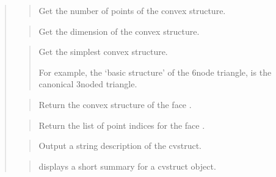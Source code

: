 \documentclass[a4paper,11pt,english]{sphinxmanual}
\begin{document}
\begin{quote}

\begin{quote}

Get the number of points of the convex structure.
\end{quote}

\begin{quote}

Get the dimension of the convex structure.
\end{quote}

\begin{quote}

Get the simplest convex structure.

For example, the ‘basic structure’ of the 6\sphinxhyphen{}node triangle, is the
canonical 3\sphinxhyphen{}noded triangle.
\end{quote}

\begin{quote}

Return the convex structure of the face .
\end{quote}

\begin{quote}

Return the list of point indices for the face .
\end{quote}

\begin{quote}

Output a string description of the cvstruct.
\end{quote}

\begin{quote}

displays a short summary for a cvstruct object.
\end{quote}
\end{quote}
\end{document}
